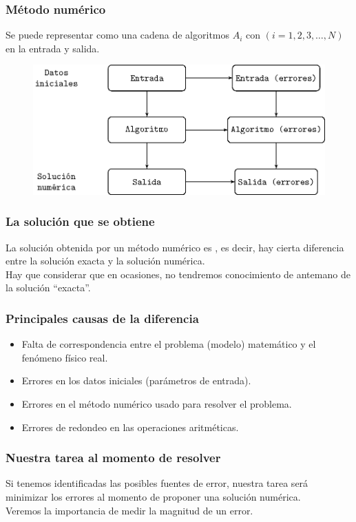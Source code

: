 \documentclass[12pt]{beamer}
\begin{document}
\begin{frame}
\frametitle{Método numérico}
Se puede representar como una cadena de algoritmos $A_{i}$ con $(i = 1, 2, 3, \ldots , N)$ en la entrada y salida.
\\
\bigskip
\pause
\begin{figure}
\centering
\includegraphics[scale=0.7]{Imagenes/dibujometodonum.eps} 
\end{figure}
\end{frame}
\begin{frame}
\frametitle{La solución que se obtiene}
La solución obtenida por un método numérico es , es decir, hay cierta diferencia entre la solución exacta y la solución numérica.
\\
\bigskip
\pause
Hay que considerar que en ocasiones, no tendremos conocimiento de antemano de la solución \enquote{exacta}.
\end{frame}
\begin{frame}
\frametitle{Principales causas de la diferencia}
\begin{itemize}[<+->]
\item[\ding{217}] Falta de correspondencia entre el problema (modelo) matemático y el fenómeno físico real.
\item[\ding{217}] Errores en los datos iniciales (parámetros de entrada).
\item[\ding{217}] Errores en el método numérico usado para resolver el problema.
\item[\ding{217}] Errores de redondeo en las operaciones aritméticas.
\end{itemize}
\end{frame}
\begin{frame}[fragile]
\frametitle{Nuestra tarea al momento de resolver}
Si tenemos identificadas las posibles fuentes de error, nuestra tarea será minimizar los errores al momento de proponer una solución numérica.
\\
\bigskip
\pause
Veremos la importancia de medir la magnitud de un error.
\end{frame}
\end{document}
